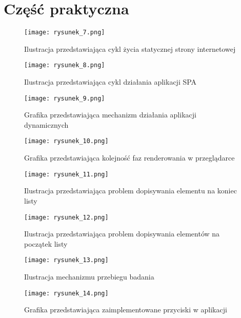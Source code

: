 \chapter{Część praktyczna}


\begin{figure}[!ht]
    \centering
    \texttt{[image: rysunek\_7.png]}
    \caption{Ilustracja przedstawiająca cykl życia statycznej strony internetowej}
    \label{fig:rysunek_7}
\end{figure}

\begin{figure}[!ht]
    \centering
    \texttt{[image: rysunek\_8.png]}
    \caption{Ilustracja przedstawiająca cykl działania aplikacji SPA}
    \label{fig:rysunek_8}
\end{figure}

\begin{figure}[!ht]
    \centering
    \texttt{[image: rysunek\_9.png]}
    \caption{Grafika przedstawiająca mechanizm działania aplikacji dynamicznych}
    \label{fig:rysunek_9}
\end{figure}

\begin{figure}[!ht]
    \centering
    \texttt{[image: rysunek\_10.png]}
    \caption{Grafika przedstawiająca kolejność faz renderowania w przeglądarce}
    \label{fig:rysunek_10}
\end{figure}

\begin{figure}[!ht]
    \centering
    \texttt{[image: rysunek\_11.png]}
    \caption{Ilustracja przedstawiająca problem dopisywania elementu na koniec listy}
    \label{fig:rysunek_11}
\end{figure}

\begin{figure}[!ht]
    \centering
    \texttt{[image: rysunek\_12.png]}
    \caption{Ilustracja przedstawiająca problem dopisywania elementów na początek listy}
    \label{fig:rysunek_12}
\end{figure}

\begin{figure}[!ht]
    \centering
    \texttt{[image: rysunek\_13.png]}
    \caption{Ilustracja mechanizmu przebiegu badania}
    \label{fig:rysunek_13}
\end{figure}

\begin{figure}[!ht]
    \centering
    \texttt{[image: rysunek\_14.png]}
    \caption{Grafika przedstawiająca zaimplementowane przyciski w aplikacji}
    \label{fig:rysunek_14}
\end{figure}

